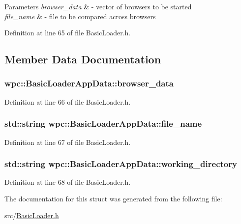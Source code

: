 \begin{DoxyParams}{Parameters}
{\em browser\-\_\-data} & -\/ vector of browsers to be started \\
\hline
{\em file\-\_\-name} & -\/ file to be compared across browsers \\
\hline
\end{DoxyParams}


Definition at line 65 of file Basic\-Loader.\-h.



\subsection{Member Data Documentation}
\hypertarget{structwpc_1_1_basic_loader_app_data_acf149c4e47abbd1cfa328c34454d7f9d}{
\subsubsection[{browser\-\_\-data}]{ wpc\-::\-Basic\-Loader\-App\-Data\-::browser\-\_\-data}}\label{structwpc_1_1_basic_loader_app_data_acf149c4e47abbd1cfa328c34454d7f9d}


Definition at line 66 of file Basic\-Loader.\-h.

\hypertarget{structwpc_1_1_basic_loader_app_data_ae2d689df0e7b350df3a9ac5a56d595b8}{
\subsubsection[{file\-\_\-name}]{\setlength{\rightskip}{0pt plus 5cm}std\-::string wpc\-::\-Basic\-Loader\-App\-Data\-::file\-\_\-name}}\label{structwpc_1_1_basic_loader_app_data_ae2d689df0e7b350df3a9ac5a56d595b8}


Definition at line 67 of file Basic\-Loader.\-h.

\hypertarget{structwpc_1_1_basic_loader_app_data_addbe7c7423efac0a937ff257d20432ef}{
\subsubsection[{working\-\_\-directory}]{\setlength{\rightskip}{0pt plus 5cm}std\-::string wpc\-::\-Basic\-Loader\-App\-Data\-::working\-\_\-directory}}\label{structwpc_1_1_basic_loader_app_data_addbe7c7423efac0a937ff257d20432ef}


Definition at line 68 of file Basic\-Loader.\-h.



The documentation for this struct was generated from the following file\-:\begin{DoxyCompactItemize}
\item 
src/\hyperlink{_basic_loader_8h}{Basic\-Loader.\-h}\end{DoxyCompactItemize}
